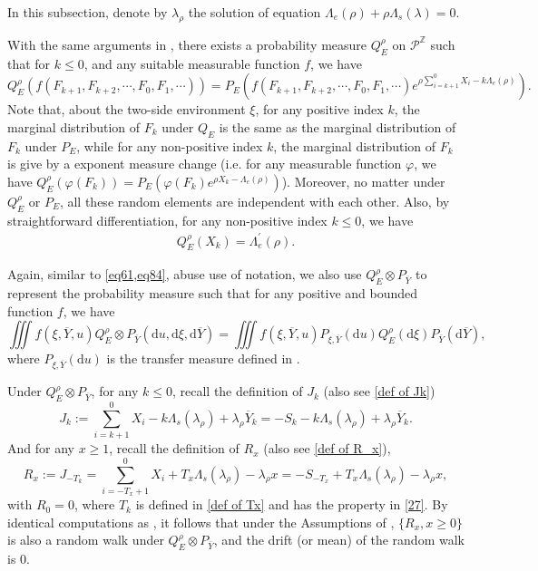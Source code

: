 \documentclass[]{article}
\numberwithin{equation}{section}
\theoremstyle{thmstyleone}%
\theoremstyle{thmstyletwo}%
\theoremstyle{thmstylethree}%
\theoremstyle{thmstylefour}%
\theoremstyle{thmstylefive}%
\theoremstyle{thmstylesix}%
\renewcommand{\d}{\mathrm{d}}
\begin{document}
	In this subsection, denote by $\lambda_\rho$ the solution of equation $\Lambda_e(\rho)+\rho\Lambda_s(\lambda) =0$.
	
	With the same arguments in , there exists a probability measure  $Q^\rho_E$ on $\mathcal{P}^{\mathbb{Z}}$ such that for $k\leqslant 0$, and any suitable measurable function $f$, we have
	\begin{equation*}
		Q^{\rho}_E\left(
		f(F_{k+1},F_{k+2},\cdots,F_0,F_1,\cdots)
		\right) = P_E\left(
		f(F_{k+1},F_{k+2},\cdots,F_0,F_1,\cdots) e^{\rho\sum\limits_{i=k+1}^{0} X_i-k\Lambda_e(\rho)}
		\right).
	\end{equation*}
	Note that, about the two-side environment $\xi$, for any positive index $k$, the marginal distribution of $F_k$ under $Q_E$ is the same as the marginal distribution of $F_k$ under $P_E$, while for any non-positive index $k$, the marginal distribution of $F_k$ is give by a exponent measure change (i.e. for any measurable function $\varphi$, we have $Q^\rho_E(\varphi(F_k)) = P_E\left( \varphi(F_k) e^{\rho X_k-\Lambda_e(\rho)} \right)$). Moreover, no matter under $Q^\rho_E$ or $P_E$, all these random elements are independent with each other.
	Also, by straightforward differentiation, for any non-positive index $k\leqslant 0$, we have
	\begin{align*}
		Q^\rho_E\left(X_{k}\right) = \Lambda_e^{\prime}(\rho).
	\end{align*}
	
	Again, similar to \cref{eq61,eq84}, abuse use of notation, we also use $Q_E^\rho\otimes P_{\overline{Y}}$ to represent the probability measure such that for any positive and bounded function $f$, we have
	\begin{equation}
		\iiint f(\xi,\overline{Y},u) Q^\rho_E\otimes P_{\overline{Y}}(\d u,\d \xi,\d \overline{Y})
		=
		\iiint f(\xi,\overline{Y},u) P_{\xi,\overline{Y}}(\d u) Q^\rho_E(\d \xi) P_{\overline{Y}} (\d \overline{Y}),
	\end{equation}
	where $ P_{\xi,\overline{Y}}(\d u) $ is the transfer measure defined in .
	
	Under $Q^\rho_E\otimes P_{\overline{Y}}$, 
	for any $k\leqslant0$, recall the definition of $J_k$ (also see \cref{def of Jk})
	\begin{equation}\label{def of Jk3}
		J_k := \sum_{i=k+1}^{0} X_i -k\Lambda_s(\lambda_\rho)+\lambda_\rho \overline{Y}_{k}= -S_k-k\Lambda_s(\lambda_\rho)+\lambda_\rho \overline{Y}_k.
	\end{equation}
	And for any $x\geqslant 1$, recall the definition of $R_x$ (also see \cref{def of R_x}),
	\begin{equation}\label{def of R_x3}
		R_x :=J_{-T_k}= \sum_{i=-T_x+1}^{0} X_i +T_x\Lambda_s(\lambda_\rho)-\lambda_\rho x
		=
		-S_{-T_x} +T_x\Lambda_s(\lambda_\rho)-\lambda_\rho x,
	\end{equation}
	with $R_0 = 0$, where $T_k$ is defined in \cref{def of Tx} and has the property in \cref{27}. 
	By identical computations as , it follows that under the Assumptions of , $\{R_x,x\geqslant0\}$ is also a random walk under $Q^\rho_E\otimes P_{\overline{Y}}$, and the drift (or mean) of the random walk is 0.
	
\end{document}

